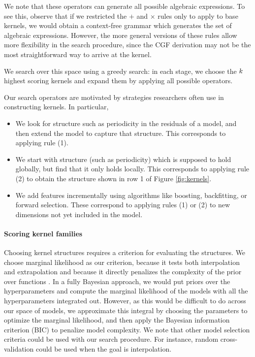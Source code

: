 \documentclass[twoside]{article}
\begin{document}
We note that these operators can generate all possible algebraic expressions. To see this, observe that if we restricted the $+$ and $\times$ rules only to apply to base kernels, we would obtain a context-free grammar which generates the set of algebraic expressions. However, the more general versions of these rules allow more flexibility in the search procedure, since the CGF derivation may not be the most straightforward way to arrive at the kernel.

We search over this space using a greedy search: in each stage, we choose the $k$ highest scoring kernels and expand them by applying all possible operators.

Our search operators are motivated by strategies researchers often use in constructing kernels. In particular,
\begin{itemize}
\item We look for structure such as periodicity in the residuals of a model, and then extend the model to capture that structure. This corresponds to applying rule (1).
\item We start with structure (such as periodicity) which is supposed to hold globally, but find that it only holds locally. This corresponds to applying rule (2) to obtain the structure shown in row 1 of Figure \ref{fig:kernels}.
\item We add features incrementally using algorithms like boosting, backfitting, or forward selection. These correspond to applying rules (1) or (2) to new dimensions not yet included in the model.
\end{itemize}

\paragraph{Scoring kernel families}

Choosing kernel structures requires a criterion for evaluating the structures.
We choose marginal likelihood as our criterion, because it tests both interpolation and extrapolation and because it directly penalizes the complexity of the prior over functions \cite{rasmussen2001occam}.
In a fully Bayesian approach, we would put priors over the hyperparameters and compute the marginal likelihood of the models with all the hyperparameters integrated out.
However, as this would be difficult to do across our space of models, we approximate this integral by choosing the parameters to optimize the marginal likelihood, and then apply the Bayesian information criterion (BIC) to penalize model complexity. 
We note that other model selection criteria could be used with our search procedure.
For instance, random cross-validation could be used when the goal is interpolation.
\end{document}
